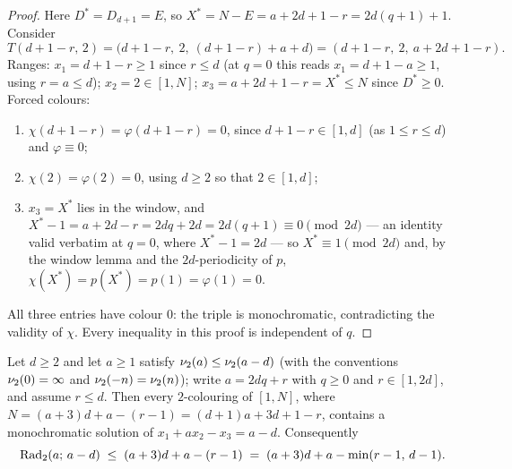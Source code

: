 \begin{proof}
Here $D^{*} = D_{d+1} = E$, so
$X^{*} = N - E = a + 2d + 1 - r = 2d(q+1) + 1$. Consider
\[
T(d + 1 - r,\, 2)
= \bigl(d + 1 - r,\ 2,\ (d + 1 - r) + a + d\bigr)
= (d + 1 - r,\ 2,\ a + 2d + 1 - r) .
\]
Ranges: $x_1 = d + 1 - r \ge 1$ since $r \le d$ (at $q = 0$ this reads
$x_1 = d + 1 - a \ge 1$, using $r = a \le d$); $x_2 = 2 \in [1, N]$;
$x_3 = a + 2d + 1 - r = X^{*} \le N$ since $D^{*} \ge 0$. Forced colours:
\begin{enumerate}
\item[(1)] $\chi(d + 1 - r) = \varphi(d + 1 - r) = 0$, since
$d + 1 - r \in [1, d]$ (as $1 \le r \le d$) and $\varphi \equiv 0$;
\item[(2)] $\chi(2) = \varphi(2) = 0$, using $d \ge 2$ so that
$2 \in [1, d]$;
\item[(3)] $x_3 = X^{*}$ lies in the window, and
$X^{*} - 1 = a + 2d - r = 2dq + 2d = 2d(q+1) \equiv 0 \pmod{2d}$ --- an
identity valid verbatim at $q = 0$, where $X^{*} - 1 = 2d$ --- so
$X^{*} \equiv 1 \pmod{2d}$ and, by the window lemma and the
$2d$-periodicity of $p$,
$\chi(X^{*}) = p(X^{*}) = p(1) = \varphi(1) = 0$.
\end{enumerate}
All three entries have colour $0$: the triple is monochromatic,
contradicting the validity of $\chi$. Every inequality in this proof is
independent of $q$.
\end{proof}

\begin{theorem}\label{thm:ub1-unified}
Let $d \ge 2$ and let $a \ge 1$ satisfy $\nu_2(a) \le \nu_2(a - d)$ (with
the conventions $\nu_2(0) = \infty$ and $\nu_2(-n) = \nu_2(n)$); write
$a = 2dq + r$ with $q \ge 0$ and $r \in [1, 2d]$, and assume $r \le d$.
Then every $2$-colouring of $[1, N]$, where
$N = (a+3)d + a - (r-1) = (d+1)a + 3d + 1 - r$, contains a monochromatic
solution of $x_1 + a x_2 - x_3 = a - d$. Consequently
\[
\mathrm{Rad}_2(a;\, a - d) \;\le\; (a+3)d + a - (r-1)
\;=\; (a+3)d + a - \min(r-1,\, d-1) .
\]
\end{theorem}

